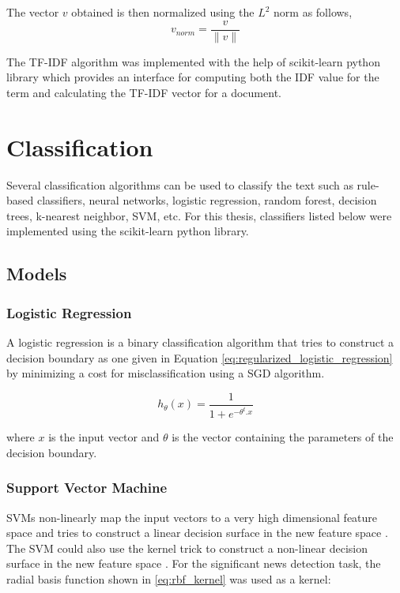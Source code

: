 The vector $v$ obtained is then normalized using the $L^2$ norm as follows,
\begin{equation}
    v_{norm} = \frac{v}{\lVert v \rVert}
\end{equation}

The TF-IDF algorithm was implemented with the help of scikit-learn \cite{scikit-learn} python library which provides an interface for computing both the IDF value for the term and calculating the TF-IDF vector for a document.

\section{Classification}\label{classification}
Several classification algorithms can be used to classify the text such as rule-based classifiers, neural networks, logistic regression, random forest, decision trees, k-nearest neighbor, SVM\cite{cortes1995support}, etc. 
For this thesis, classifiers listed below were implemented using the scikit-learn python library.

\subsection{Models}
\subsubsection{Logistic Regression}
A logistic regression is a binary classification algorithm that tries to construct a decision boundary as one given in Equation \eqref{eq:regularized_logistic_regression} by minimizing a cost for misclassification using a SGD algorithm.

\begin{equation}
    \label{eq:regularized_logistic_regression}
    h_{\theta}(x) = \frac{1}{1 + {e}^{-{\theta}^{t}. x}}
\end{equation}

\noindent
where $x$ is the input vector and $\theta$ is the vector containing the parameters of the decision boundary. 

\subsubsection{Support Vector Machine}
SVMs non-linearly map the input vectors to a very high dimensional feature space and tries to construct a linear decision surface in the new feature space \cite{cortes1995support}. The SVM could also use the kernel trick to construct a non-linear decision surface in the new feature space \cite{cortes1995support}. For the significant news detection task, the radial basis function shown in \eqref{eq:rbf_kernel} was used as a kernel:


